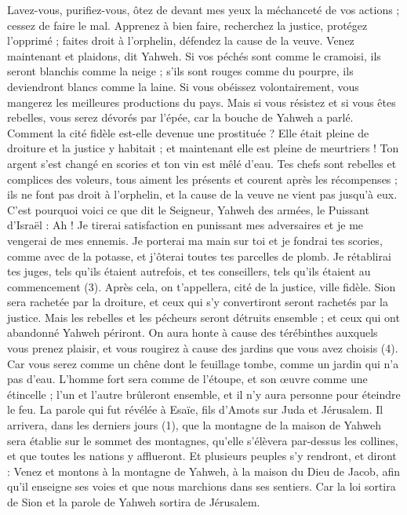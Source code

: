 \begin{multicols}{2}
Lavez-vous, purifiez-vous, ôtez de devant mes yeux la méchanceté de vos actions ; cessez de faire le mal.
Apprenez à bien faire, recherchez la justice, protégez l’opprimé ; faites droit à l'orphelin, défendez la cause de la veuve.
Venez maintenant et plaidons, dit Yahweh. Si vos péchés sont comme le cramoisi, ils seront blanchis comme la neige ; s’ils sont rouges comme du pourpre, ils deviendront blancs comme la laine.
Si vous obéissez volontairement, vous mangerez les meilleures productions du pays.
Mais si vous résistez et si vous êtes rebelles, vous serez dévorés par l'épée, car la bouche de Yahweh a parlé.
Comment la cité fidèle est-elle devenue une prostituée ? Elle était pleine de droiture et la justice y habitait ; et maintenant elle est pleine de meurtriers !
Ton argent s’est changé en scories et ton vin est mêlé d'eau.
Tes chefs sont rebelles et complices des voleurs, tous aiment les présents et courent après les récompenses ; ils ne font pas droit à l'orphelin, et la cause de la veuve ne vient pas jusqu’à eux.
C'est pourquoi voici ce que dit le Seigneur, Yahweh des armées, le Puissant d'Israël : Ah ! Je tirerai satisfaction en punissant mes adversaires et je me vengerai de mes ennemis.
Je porterai ma main sur toi et je fondrai tes scories, comme avec de la potasse, et j'ôterai toutes tes parcelles de plomb.
Je rétablirai tes juges, tels qu'ils étaient autrefois, et tes conseillers, tels qu’ils étaient au commencement (3). Après cela, on t'appellera, cité de la justice, ville fidèle.
Sion sera rachetée par la droiture, et ceux qui s’y convertiront seront rachetés par la justice.
Mais les rebelles et les pécheurs seront détruits ensemble ; et ceux qui ont abandonné Yahweh périront.
On aura honte à cause des térébinthes auxquels vous prenez plaisir, et vous rougirez à cause des jardins que vous avez choisis (4).
Car vous serez comme un chêne dont le feuillage tombe, comme un jardin qui n'a pas d'eau.
L’homme fort sera comme de l'étoupe, et son œuvre comme une étincelle ; l’un et l’autre brûleront ensemble, et il n'y aura personne pour éteindre le feu.
\VerseOne{}La parole qui fut révélée à Esaïe, fils d'Amots sur Juda et Jérusalem.
Il arrivera, dans les derniers jours (1), que la montagne de la maison de Yahweh sera établie sur le sommet des montagnes, qu'elle s’élèvera par-dessus les collines, et que toutes les nations y afflueront.
Et plusieurs peuples s’y rendront, et diront : Venez et montons à la montagne de Yahweh, à la maison du Dieu de Jacob, afin qu’il enseigne ses voies et que nous marchions dans ses sentiers. Car la loi sortira de Sion et la parole de Yahweh sortira de Jérusalem.

\end{multicols}
